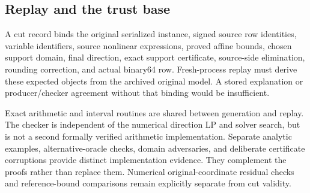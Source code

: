 \subsection{Replay and the trust base}

A cut record binds the original serialized instance, signed source row
identities, variable identifiers, source nonlinear expressions, proved
affine bounds, chosen support domain, final direction, exact support
certificate, source-side elimination, rounding correction, and actual
binary64 row. Fresh-process replay must derive these expected objects
from the archived original model. A stored explanation or producer/checker
agreement without that binding would be insufficient.

Exact arithmetic and interval routines are shared between generation and
replay. The checker is independent of the numerical direction LP and
solver search, but is not a second formally verified arithmetic
implementation. Separate analytic examples, alternative-oracle checks,
domain adversaries, and deliberate certificate corruptions provide distinct
implementation evidence. They complement the proofs rather than replace
them. Numerical original-coordinate residual checks and reference-bound
comparisons remain explicitly separate from cut validity.
